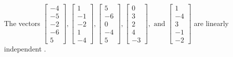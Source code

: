 \begin{exercise}
\begin{exerciseStatement}
  \end{exerciseStatement}
  \begin{exerciseAnswer}
   The vectors \(\left[\begin{array}{r}
-4 \\
-5 \\
-2 \\
-6 \\
5
\end{array}\right] , \left[\begin{array}{r}
1 \\
-1 \\
-2 \\
1 \\
-4
\end{array}\right] , \left[\begin{array}{r}
5 \\
-6 \\
0 \\
-4 \\
5
\end{array}\right] , \left[\begin{array}{r}
0 \\
3 \\
2 \\
4 \\
-3
\end{array}\right] , \text{ and } \left[\begin{array}{r}
1 \\
-4 \\
3 \\
-1 \\
-2
\end{array}\right]\) are 
  	 linearly independent  .
  


  \end{exerciseAnswer}
\end{exercise}